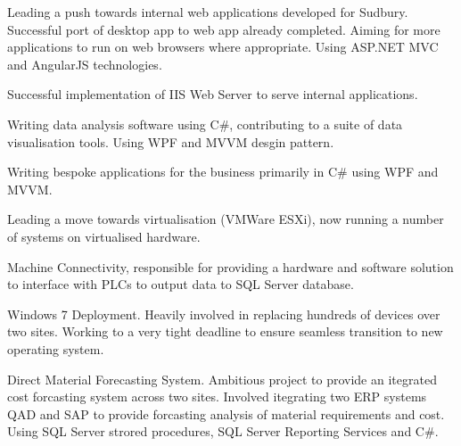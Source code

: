 \documentclass[a4paper]{deedy-resume} %
\newcommand{\Csh}{C{\lserif\#}}
\begin{document}
\begin{minipage}[t]{0.66\textwidth}
\begin{tightitemize}
\end{tightitemize} 

\sectionspace %



\vspace{\topsep} %
\begin{tightitemize}
\item Leading a push towards internal web applications developed for Sudbury. Successful port of desktop app to web app already completed. Aiming for more applications to run on web browsers where appropriate. Using ASP.NET MVC and AngularJS technologies. 
\item Successful implementation of IIS Web Server to serve internal applications.
\item Writing data analysis software using \Csh{}, contributing to a suite of data visualisation tools. Using WPF and MVVM desgin pattern.
\item Writing bespoke applications for the business primarily in \Csh{} using WPF and MVVM.
\item Leading a move towards virtualisation (VMWare ESXi), now running a number of systems on virtualised hardware.
\item Machine Connectivity, responsible for providing a hardware and software solution to interface with PLCs to output data to SQL Server database.
\item Windows 7 Deployment. Heavily involved in replacing hundreds of devices over two sites. Working to a very tight deadline to ensure seamless transition to new operating system.
\item Direct Material Forecasting System. Ambitious project to provide an itegrated cost forcasting system across two sites. Involved itegrating two ERP systems QAD and SAP to provide forcasting analysis of material requirements and cost. Using SQL Server strored procedures, SQL Server Reporting Services and \Csh{}.  
\end{tightitemize} 

\sectionspace %


\end{minipage} %
\end{document}
